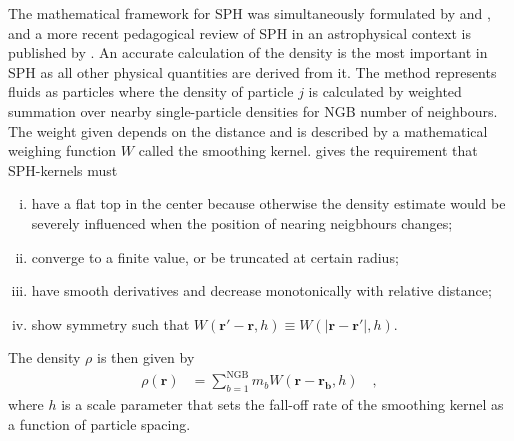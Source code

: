 \documentclass[MScProj_TLRH_ClusterEnergy.tex]{subfiles}
\begin{document}
The mathematical framework for SPH was simultaneously formulated by 
\citet{1977AJ.....82.1013L} and \citet{1977MNRAS.181..375G}, and a more recent
pedagogical review of SPH in an astrophysical context is published by
\citet{Price2012759}. An accurate calculation of the density is the most important 
in SPH as all other physical quantities are derived from it. The method represents
fluids as particles where the density of particle $j$ is calculated by weighted 
summation over nearby single-particle densities for NGB number of neighbours.
The weight given depends on the distance and is described by a mathematical 
weighing function $W$ called the smoothing kernel. \citet{Price2012759} gives 
the requirement that SPH-kernels must
\begin{enumerate}[i)]
    \item have a flat top in the center because otherwise the density estimate
          would be severely influenced when the position of nearing neigbhours
          changes;
    \item converge to a finite value, or be truncated at certain radius;
    \item have smooth derivatives and decrease monotonically with relative distance;
    \item show symmetry such that $W(\mathbf{r}'-\mathbf{r},h) \equiv 
          W(|\mathbf{r}-\mathbf{r'}|,h)$.
\end{enumerate}

\noindent The density $\rho$ is then given by
\begin{align}
    \rho (\mathbf{r}) &= \sum\limits_{b=1}^{\text{NGB}} m_b
        W(\mathbf{r}-\mathbf{r_b}, h) \label{eq:sphdensity} \quad ,
\end{align}
\noindent where $h$ is a scale parameter that sets the fall-off rate of the
smoothing kernel as a function of particle spacing.
\end{document}
